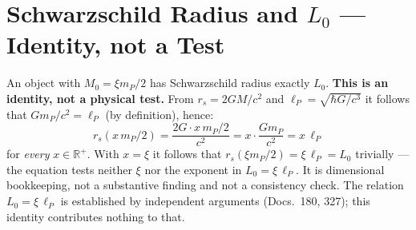 \section*{Schwarzschild Radius and $L_0$ --- Identity, not a Test}

An object with $M_0 = \xi m_P/2$ has Schwarzschild radius exactly $L_0$.
\textbf{This is an identity, not a physical test.}
From $r_s = 2GM/c^2$ and $\ell_P = \sqrt{\hbar G/c^3}$ it follows
that $Gm_P/c^2 = \ell_P$ (by definition), hence:
\[
  r_s(x\,m_P/2) = \frac{2G\cdot x\,m_P/2}{c^2} = x\cdot\frac{Gm_P}{c^2} = x\,\ell_P
\]
for \emph{every} $x\in\mathbb{R}^+$. With $x=\xi$ it follows that
$r_s(\xi m_P/2)=\xi\,\ell_P=L_0$ trivially --- the equation tests neither
$\xi$ nor the exponent in $L_0=\xi\,\ell_P$. It is dimensional bookkeeping,
not a substantive finding and not a consistency check.
The relation $L_0=\xi\,\ell_P$ is established by independent arguments
(Docs.~180, 327); this identity contributes nothing to that.
